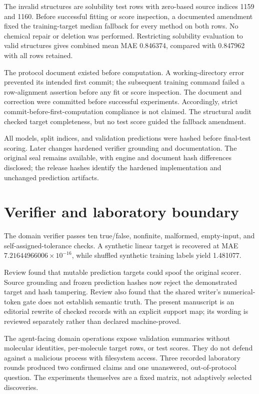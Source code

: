 \documentclass[10pt,twocolumn,a4paper]{article}
\theoremstyle{definition}\newtheorem{observation}{Numerical observation}
\theoremstyle{remark}\newtheorem{remark}{Remark}
\begin{document}
The invalid structures are solubility test rows with zero-based source indices 1159 and 1160. Before successful fitting or score inspection, a documented amendment fixed the training-target median fallback for every method on both rows. No chemical repair or deletion was performed. Restricting solubility evaluation to valid structures gives combined mean MAE 0.846374, compared with 0.847962 with all rows retained.

The protocol document existed before computation. A working-directory error prevented its intended first commit; the subsequent training command failed a row-alignment assertion before any fit or score inspection. The document and correction were committed before successful experiments. Accordingly, strict commit-before-first-computation compliance is not claimed. The structural audit checked target completeness, but no test score guided the fallback amendment.

All models, split indices, and validation predictions were hashed before final-test scoring. Later changes hardened verifier grounding and documentation. The original seal remains available, with engine and document hash differences disclosed; the release hashes identify the hardened implementation and unchanged prediction artifacts.

\section{Verifier and laboratory boundary}\label{app:verifier}
The domain verifier passes ten true/false, nonfinite, malformed, empty-input, and self-assigned-tolerance checks. A synthetic linear target is recovered at MAE $7.21644966006\times10^{-16}$, while shuffled synthetic training labels yield 1.481077.

Review found that mutable prediction targets could spoof the original scorer. Source grounding and frozen prediction hashes now reject the demonstrated target and hash tampering. Review also found that the shared writer's numerical-token gate does not establish semantic truth. The present manuscript is an editorial rewrite of checked records with an explicit support map; its wording is reviewed separately rather than declared machine-proved.

The agent-facing domain operations expose validation summaries without molecular identities, per-molecule target rows, or test scores. They do not defend against a malicious process with filesystem access. Three recorded laboratory rounds produced two confirmed claims and one unanswered, out-of-protocol question. The experiments themselves are a fixed matrix, not adaptively selected discoveries.
\end{document}
